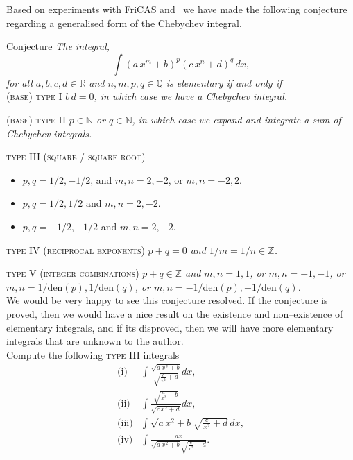\medskip

Based on experiments with FriCAS and \mma\, we have made the following conjecture regarding a generalised form of the Chebychev integral.

\medskip

\noindent\textsf{Conjecture} \qquad \textit{The integral,
$$\int \left(a\,x^m+b\right)^p\left(c\,x^n+d\right)^q\,dx,$$
for all $a,b,c,d \in \mathbb{R}$ and $n,m,p,q \in \mathbb{Q}$ is elementary if and only if} \\

\noindent\textsc{(base) type I} \qquad \textit{$b\,d = 0$, in which case we have a Chebychev integral.}

\medskip

\noindent\textsc{(base) type II} \qquad \textit{$p \in \mathbb{N}$ or $q \in \mathbb{N}$, in which case we expand and integrate a sum of Chebychev integrals.} 

\medskip

\noindent\textsc{type III (square / square root)} 
\begin{itemize}
\item[--] $p,q = 1/2, -1/2$, and $m,n = 2,-2$, or $m,n = -2,2$.
\item[--] $p,q = 1/2, 1/2$ and $m,n = 2,-2$. 
\item[--] $p,q = -1/2, -1/2$ and $m,n = 2,-2$. 
\end{itemize}

\medskip

\noindent\textsc{type IV (reciprocal exponents)} \qquad \textit{$p+q = 0$ and $1/m = 1/n \in \mathbb{Z}$.}

\medskip

\noindent\textsc{type V (integer combinations)} \qquad \textit{$p+q \in \mathbb{Z}$ and $m,n=1,1$, or $m,n=-1,-1$, or $m,n = 1/\text{den}(p), 1/\text{den}(q)$, or $m,n = -1/\text{den}(p), -1/\text{den}(q)$.} \\

We would be very happy to see this conjecture resolved. If the conjecture is proved, then we would have a nice result on the existence and non--existence of elementary integrals, and if its disproved, then we will have more elementary integrals that are unknown to the author. \\

Compute the following \textsc{type III} integrals
\allowdisplaybreaks
\begin{align*}
\text{(i)} & \int \frac{\sqrt{a\, x^2+b}}{\sqrt{\frac{c}{x^2}+d}} dx,\\
\text{(ii)} & \int \frac{\sqrt{\frac{a}{x^2}+b}}{\sqrt{c\, x^2+d}} dx, \\
\text{(iii)} & \int \sqrt{a\, x^2+b} \sqrt{\frac{c}{x^2}+d}\, dx, \\
\text{(iv)} & \int \frac{dx}{\sqrt{a\, x^2+b} \sqrt{\frac{c}{x^2}+d}}.
\end{align*}

